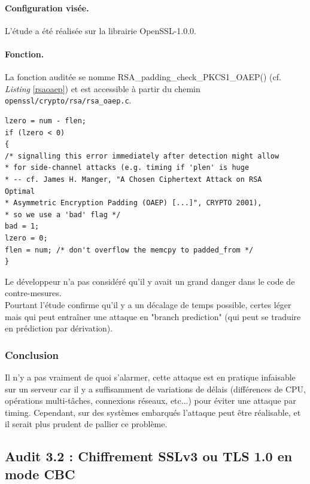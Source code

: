 \paragraph{Configuration visée.\\}

L'étude a été réalisée sur la librairie OpenSSL-1.0.0.

\paragraph{Fonction.\\}

La fonction auditée se nomme RSA\_padding\_check\_PKCS1\_OAEP() (cf. \textit{Listing} \ref{rsaoaep}) et est accessible à partir du chemin \texttt{openssl/crypto/rsa/rsa\_oaep.c}.


\begin{lstlisting}[style=customc,caption=rsa\_oaep.c,
label=rsaoaep]
lzero = num - flen;
if (lzero < 0)
{
/* signalling this error immediately after detection might allow
* for side-channel attacks (e.g. timing if 'plen' is huge
* -- cf. James H. Manger, "A Chosen Ciphertext Attack on RSA
Optimal
* Asymmetric Encryption Padding (OAEP) [...]", CRYPTO 2001),
* so we use a 'bad' flag */
bad = 1;
lzero = 0;
flen = num; /* don't overflow the memcpy to padded_from */
}
\end{lstlisting}

Le développeur n'a pas considéré qu'il y avait un grand danger dans le code de contre-mesures.\\
Pourtant l'étude confirme qu'il y a un décalage de temps possible, certes léger mais qui peut entraîner une attaque en "branch prediction" (qui peut se traduire en prédiction par dérivation).\\

\subsubsection{Conclusion}

Il n'y a pas vraiment de quoi s'alarmer, cette attaque est en pratique infaisable sur un serveur car il y a suffisamment de variations de délais (différences de CPU, opérations multi-tâches, connexions réseaux, etc...) pour éviter une attaque par timing. Cependant, sur des systèmes embarqués l'attaque peut être réalisable, et il serait plus prudent de pallier ce problème.

\subsection{Audit 3.2 : Chiffrement SSLv3 ou TLS 1.0 en mode CBC}
